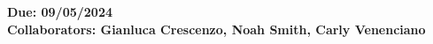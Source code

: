 \documentclass[10pt]{mypackage}
\renewcommand*{\mathbb}[1]{\varmathbb{#1}}
\begin{document}
\begin{center}
  \bfseries
  Due: 09/05/2024\\

  Collaborators: Gianluca Crescenzo, Noah Smith, Carly Venenciano
\end{center}
%
\end{document}
